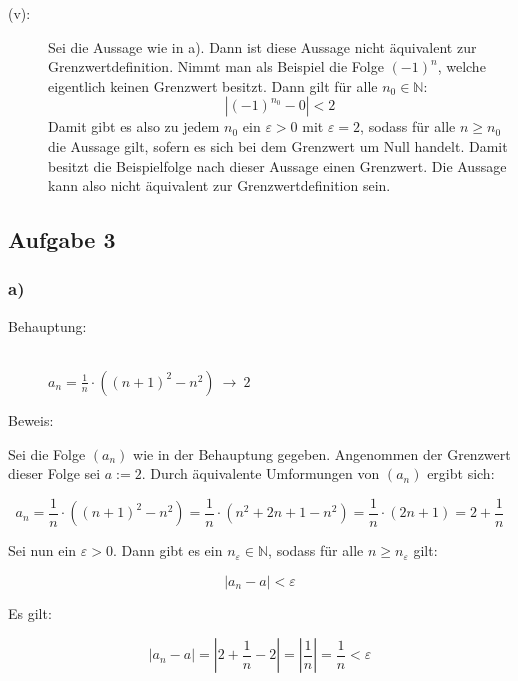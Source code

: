 \documentclass[10pt, a4paper]{article}
\begin{document}
\begin{description}
				\item[(v):] Sei die Aussage wie in a). Dann ist diese Aussage nicht äquivalent zur Grenzwertdefinition. Nimmt man als Beispiel die Folge $(-1)^n$, welche eigentlich keinen Grenzwert besitzt. Dann gilt für alle $n_0 \in \mathbb{N}$:
				\[
					|(-1)^{n_0} - 0| < 2
				\]
				Damit gibt es also zu jedem $n_0$ ein $\varepsilon > 0$ mit $\varepsilon = 2$, sodass für alle $n \geq n_0$ die Aussage gilt, sofern es sich bei dem Grenzwert um Null handelt. Damit besitzt die Beispielfolge nach dieser Aussage einen Grenzwert. Die Aussage kann also nicht äquivalent zur Grenzwertdefinition sein.
			\end{description}


		\newpage



	\subsection*{Aufgabe 3} %
	\label{sub:aufgabe_3}

		\subsubsection*{a)} %
		\label{ssub:a_}
		
			\begin{description}
				\item[Behauptung:] \hfill \\
					$a_n = \frac{1}{n}\cdot \left( (n+1)^2 -n^2 \right) \ \longrightarrow \ 2$
				\item[Beweis:]
			\end{description}
			
			Sei die Folge $(a_n)$ wie in der Behauptung gegeben. Angenommen der Grenzwert dieser Folge sei $a := 2$. Durch äquivalente Umformungen von $(a_n)$ ergibt sich:

			\[
				a_n = \frac{1}{n}\cdot \left( (n+1)^2 -n^2 \right) = \frac{1}{n}\cdot \left( n^2 + 2n + 1 -n^2 \right) = \dfrac{1}{n}\cdot ( 2n + 1) = 2 + \dfrac{1}{n}
			\]

			Sei nun ein $\varepsilon > 0$. Dann gibt es ein $n_{\varepsilon} \in \mathbb{N}$, sodass für alle $n \geq n_{\varepsilon}$ gilt:

			\[
				|a_n - a| < \varepsilon
			\]

			Es gilt:

			\[
				|a_n-a| = \left|2+\dfrac{1}{n} - 2\right| = \left| \dfrac{1}{n} \right| = \dfrac{1}{n} < \varepsilon
			\]
\end{document}
